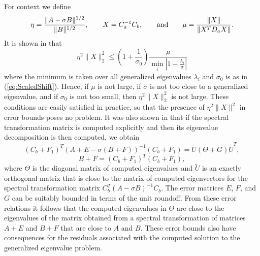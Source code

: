 For context we define
\begin{equation*}
  \eta = \frac{\|A-\sigma B\|^{1/2}}{\|B\|^{1/2}},\qquad
  X = C_a^{-1} C_b,\eqand \mu = \frac{\|X\|}{\|X^T D_a X\|}.
\end{equation*}
It is shown in \cite{stewart2024spectraltransformationdensesymmetric} that
\begin{equation*}
  \eta^2 \|X\|_2^2 \leq \left( 1 + \frac{1}{\sigma_0} \right)
  \frac{\mu}{\min_i \left| 1 - \frac{\lambda_i}{\sigma}\right|}
\end{equation*}
where the minimum is taken over all generalized eigenvalues $\lambda_i$ and $\sigma_0$ is as in (\ref{eq:ScaledShift}).  Hence, if $\mu$ is not large, if $\sigma$ is not too close to a generalized eigenvalue, and if $\sigma_0$ is not too small, then $\eta^2 \|X\|_2^2$ is not large.  These conditions are easily satisfied in practice, so that the presence of $\eta^2 \|X\|^2$ in error bounds poses no problem.  It was also shown in \cite{stewart2024spectraltransformationdensesymmetric} that if the spectral transformation matrix is computed explicitly and then its eigenvalue decomposition is then computed, we obtain
\begin{equation}
  \label{eq:mixed_errors}
  (C_b + F_1)^T (A+E - \sigma (B+F))^{-1} (C_b + F_1) 
  = \tilde{U} (\Theta + G) \tilde{U}^T,
\end{equation}
\begin{equation}
  \label{eq:B_errors}
  B+F = (C_b + F_1)^T (C_b +F_1),
\end{equation}
where $\Theta$ is the diagonal matrix of computed eigenvalues and $\tilde{U}$ is an exactly orthogonal matrix that is close to the matrix of computed eigenvectors for the spectral transformation matrix $C_b^T(A-\sigma B)^{-1} C_b$.  The error matrices $E$, $F$, and $G$ can be suitably bounded in terms of the unit roundoff.  From these error relations it follows that the computed eigenvalues in $\Theta$ are close to the eigenvalues of the matrix obtained from a spectral transformation of matrices $A+E$ and $B+F$ that are close to $A$ and $B$.  These error bounds also have consequences for the residuals associated with the computed solution to the generalized eigenvalue problem.

